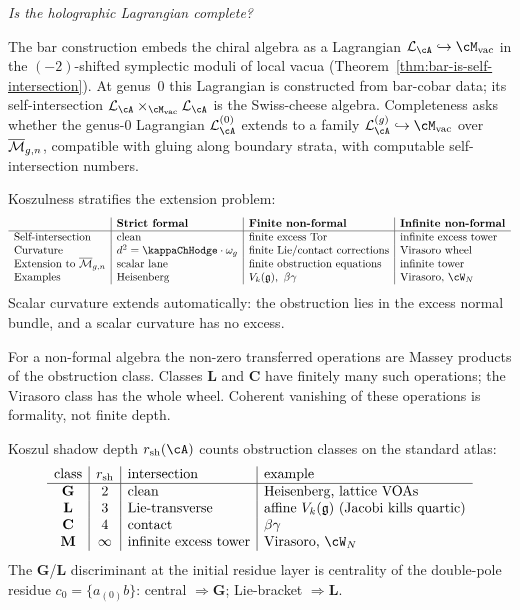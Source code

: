 \medskip
\begin{center}
\emph{Is the holographic Lagrangian complete?}
\end{center}
\medskip

The bar construction embeds the chiral algebra as a Lagrangian
$\cL_\cA \hookrightarrow \Mvac$ in the $(-2)$-shifted symplectic
moduli of local vacua
(Theorem~\ref{thm:bar-is-self-intersection}). At genus~$0$ this
Lagrangian is constructed from bar-cobar data; its
self-intersection $\cL_\cA \times_{\Mvac} \cL_\cA$ is the
Swiss-cheese algebra. Completeness asks whether the genus-$0$
Lagrangian $\cL_\cA^{(0)}$ extends to a family
$\cL_\cA^{(g)} \hookrightarrow \Mvac$ over $\overline{\mathcal M}_{g,n}$,
compatible with gluing along boundary strata, with computable
self-intersection numbers.

Koszulness stratifies the extension problem:
\[
\begin{array}{l|l|l|l}
 & \textbf{Strict formal} & \textbf{Finite non-formal}
 & \textbf{Infinite non-formal} \\
\hline
\text{Self-intersection} & \text{clean} &
 \text{finite excess Tor} & \text{infinite excess tower} \\
\text{Curvature} &
 d^2 = \kappaChHodge\cdot\omega_g &
 \text{finite Lie/contact corrections} &
 \text{Virasoro wheel} \\
\text{Extension to } \Mbar_{g,n} & \text{scalar lane} &
 \text{finite obstruction equations} & \text{infinite tower} \\
\text{Examples} & \text{Heisenberg} &
 V_k(\fg),\ \beta\gamma & \text{Virasoro, } \cW_N
\end{array}
\]
Scalar curvature extends automatically: the obstruction lies in
the excess normal bundle, and a scalar curvature has no excess.

For a non-formal algebra the non-zero transferred operations are
Massey products of the obstruction class. Classes $\mathbf{L}$ and
$\mathbf{C}$ have finitely many such operations; the Virasoro class
has the whole wheel. Coherent vanishing of these operations is
formality, not finite depth.

Koszul shadow depth $r_{\mathrm{sh}}(\cA)$ counts obstruction
classes on the standard atlas:
\[
\begin{array}{c|c|l|l}
\text{class} & r_{\mathrm{sh}} & \text{intersection} & \text{example} \\
\hline
\mathbf{G} & 2 & \text{clean} & \text{Heisenberg, lattice VOAs} \\
\mathbf{L} & 3 & \text{Lie-transverse} &
 \text{affine } V_k(\fg)\ (\text{Jacobi kills quartic}) \\
\mathbf{C} & 4 & \text{contact} & \beta\gamma \\
\mathbf{M} & \infty & \text{infinite excess tower} &
 \text{Virasoro, } \cW_N
\end{array}
\]
The $\mathbf{G}$/$\mathbf{L}$ discriminant at the initial residue layer is
centrality of the double-pole residue
$c_0 = \{a_{(0)}b\}$: central $\Rightarrow \mathbf{G}$;
Lie-bracket $\Rightarrow \mathbf{L}$.

